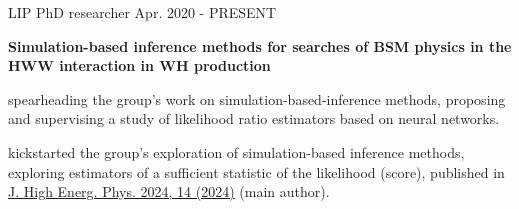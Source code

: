 

\begin{cventries}

    \cventry
    {LIP}
    {PhD researcher}
    {}
    {Apr. 2020 - PRESENT}
    {
        \textbf{Simulation-based inference methods for searches of BSM physics in the HWW interaction in WH production}\vspace{12pt}
        \begin{cvitems}      
            \item {spearheading the group's work on simulation-based-inference methods, proposing and supervising a study of likelihood ratio estimators based on neural networks.}
            \item {kickstarted the group's exploration of simulation-based inference methods, exploring estimators of a sufficient statistic of the likelihood (score), published in \href{https://doi.org/10.1007/JHEP04(2024)014}{J. High Energ. Phys. 2024, 14 (2024)} (main author).}
        \end{cvitems}
    }


\end{cventries}
